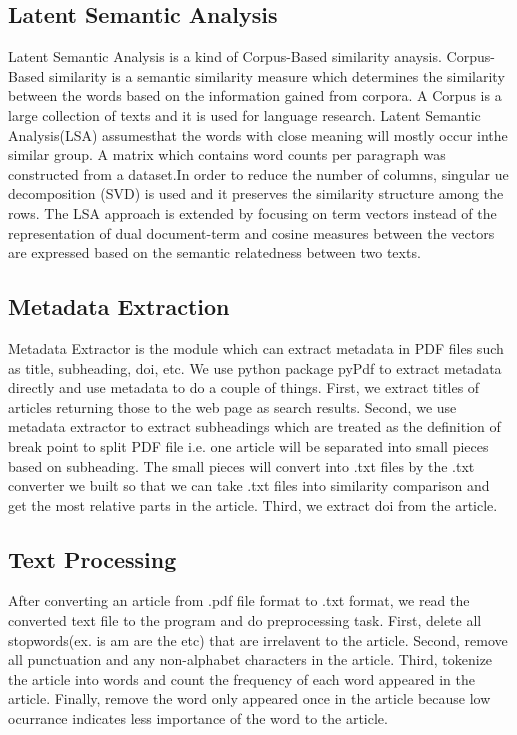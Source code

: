 \subsection{Latent Semantic Analysis}
Latent Semantic Analysis is a kind of Corpus-Based similarity anaysis. Corpus-Based similarity is a semantic similarity measure which determines the similarity between the words based on the information gained from corpora. A Corpus is a large collection of texts and it is used for language research. Latent Semantic Analysis(LSA) assumesthat the words with close meaning will mostly occur inthe similar group. A matrix which contains word counts per paragraph was constructed from a  dataset.In order to reduce the number of columns, singular ue decomposition (SVD) is used and it preserves the similarity structure among the rows. The LSA approach is extended by focusing on term vectors instead of the representation of dual document-term and cosine measures between the vectors are expressed based on the semantic relatedness between two texts.
 
\subsection{Metadata Extraction}
Metadata Extractor is the module which can extract metadata in PDF files such as title, subheading, doi, etc. We use python package pyPdf to extract metadata directly and use metadata to do a couple of things. First, we extract titles of articles returning those to the web page as search results. Second, we use metadata extractor to extract subheadings which are treated as the definition of break point to split PDF file i.e. one article will be separated into small pieces based on subheading. The small pieces will convert into .txt files by the .txt converter we built so that we can take .txt files into similarity comparison and get the most relative parts in the article. Third, we extract doi from the article. 

 \subsection{Text Processing}
 After converting an article from .pdf file format to .txt format, we read the converted text file to the program and do preprocessing task. First, delete all stopwords(ex. is am are the etc) that are irrelavent to the article. Second, remove all punctuation and any non-alphabet characters  in the article. Third, tokenize the article into words and count the frequency of each word appeared in the article. Finally, remove the word only appeared once in the article because low ocurrance indicates less importance of the word to the article.


